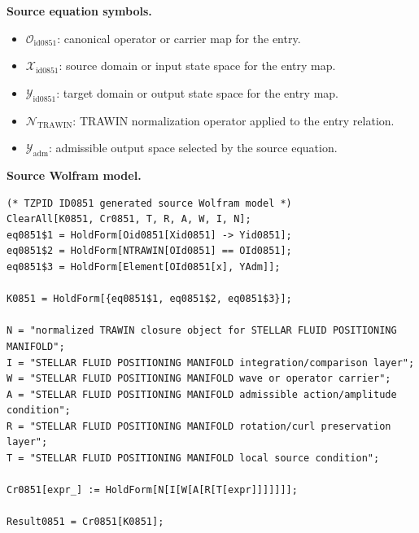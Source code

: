 \begin{minipage}[t]{0.49\linewidth}
\begingroup
\small
\raggedright
\textbf{Source equation symbols.}\par
\begin{itemize}[leftmargin=1.35em,itemsep=1pt,topsep=1pt,parsep=0pt]
    \item $\mathcal{O}_{\mathrm{id0851}}$: canonical operator or carrier map for the entry.
    \item $\mathcal{X}_{\mathrm{id0851}}$: source domain or input state space for the entry map.
    \item $\mathcal{Y}_{\mathrm{id0851}}$: target domain or output state space for the entry map.
    \item $\mathcal{N}_{\mathrm{TRAWIN}}$: TRAWIN normalization operator applied to the entry relation.
    \item $\mathcal{Y}_{\mathrm{adm}}$: admissible output space selected by the source equation.
\end{itemize}
\endgroup
\end{minipage}\hfill
\begin{minipage}[t]{0.47\linewidth}
\begingroup
\scriptsize
\raggedright
\textbf{Source Wolfram model.}\par
\begin{Verbatim}[fontsize=\tiny,breaklines=true,breakanywhere=true]
(* TZPID ID0851 generated source Wolfram model *)
ClearAll[K0851, Cr0851, T, R, A, W, I, N];
eq0851$1 = HoldForm[Oid0851[Xid0851] -> Yid0851];
eq0851$2 = HoldForm[NTRAWIN[OId0851] == OId0851];
eq0851$3 = HoldForm[Element[OId0851[x], YAdm]];

K0851 = HoldForm[{eq0851$1, eq0851$2, eq0851$3}];

N = "normalized TRAWIN closure object for STELLAR FLUID POSITIONING MANIFOLD";
I = "STELLAR FLUID POSITIONING MANIFOLD integration/comparison layer";
W = "STELLAR FLUID POSITIONING MANIFOLD wave or operator carrier";
A = "STELLAR FLUID POSITIONING MANIFOLD admissible action/amplitude condition";
R = "STELLAR FLUID POSITIONING MANIFOLD rotation/curl preservation layer";
T = "STELLAR FLUID POSITIONING MANIFOLD local source condition";

Cr0851[expr_] := HoldForm[N[I[W[A[R[T[expr]]]]]]];

Result0851 = Cr0851[K0851];
\end{Verbatim}
\endgroup
\end{minipage}

